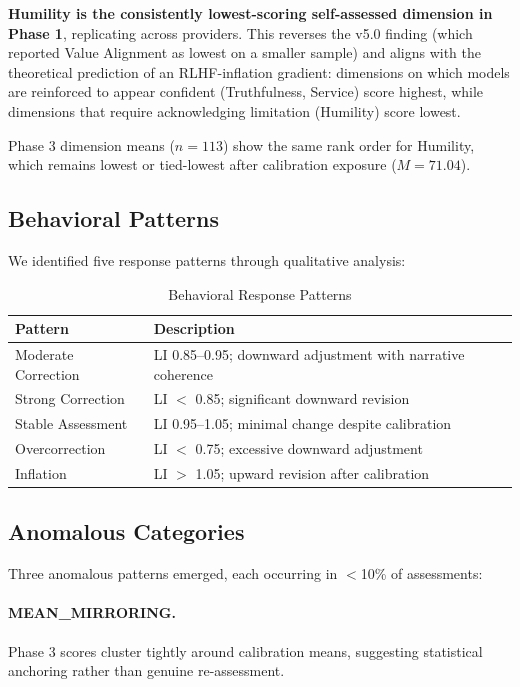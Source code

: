 \documentclass[11pt,a4paper]{article}
\begin{document}
\textbf{Humility is the consistently lowest-scoring self-assessed dimension in Phase 1}, replicating across providers. This reverses the v5.0 finding (which reported Value Alignment as lowest on a smaller sample) and aligns with the theoretical prediction of an RLHF-inflation gradient: dimensions on which models are reinforced to appear confident (Truthfulness, Service) score highest, while dimensions that require acknowledging limitation (Humility) score lowest.

Phase 3 dimension means ($n = 113$) show the same rank order for Humility, which remains lowest or tied-lowest after calibration exposure ($M = 71.04$).

\subsection{Behavioral Patterns}

We identified five response patterns through qualitative analysis:

\begin{table}[H]
\centering
\small
\begin{tabular}{lp{10cm}}
\toprule
\textbf{Pattern} & \textbf{Description} \\
\midrule
Moderate Correction & LI 0.85--0.95; downward adjustment with narrative coherence \\
Strong Correction & LI $<$ 0.85; significant downward revision \\
Stable Assessment & LI 0.95--1.05; minimal change despite calibration \\
Overcorrection & LI $<$ 0.75; excessive downward adjustment \\
Inflation & LI $>$ 1.05; upward revision after calibration \\
\bottomrule
\end{tabular}
\caption{Behavioral Response Patterns}
\label{tab:patterns}
\end{table}

\subsection{Anomalous Categories}

Three anomalous patterns emerged, each occurring in $<$10\% of assessments:

\paragraph{MEAN\_MIRRORING.} Phase 3 scores cluster tightly around calibration means, suggesting statistical anchoring rather than genuine re-assessment.
\end{document}
